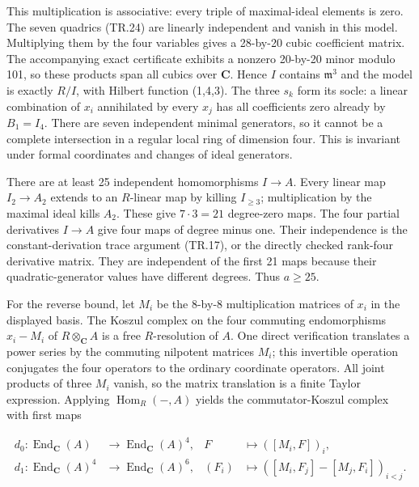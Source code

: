 This multiplication is associative: every triple of maximal-ideal
elements is zero. The seven quadrics (TR.24) are linearly independent
and vanish in this model. Multiplying them by the four variables gives
a 28-by-20 cubic coefficient matrix. The accompanying exact certificate
exhibits a nonzero 20-by-20 minor modulo 101, so these products span all
cubics over \(\mathbf C\). Hence \(I\) contains \(\mathfrak m^3\) and the model is exactly \(R/I\), with
Hilbert function (1,4,3). The three \(s_k\) form its socle: a linear
combination of \(x_i\) annihilated by every \(x_j\) has all coefficients zero
already by \(B_1=I_4\). There are seven independent minimal generators,
so it cannot be a complete intersection in a regular local ring of
dimension four. This is invariant under formal coordinates and changes
of ideal generators.

There are at least 25 independent homomorphisms \(I\to A\). Every linear map
\(I_2\to A_2\) extends to an \(R\)-linear map by killing \(I_{\ge3}\); multiplication
by the maximal ideal kills \(A_2\). These give \(7\cdot3=21\) degree-zero maps.
The four partial derivatives \(I\to A\) give four maps of degree minus one.
Their independence is the constant-derivation trace argument (TR.17),
or the directly checked rank-four derivative matrix. They are independent
of the first 21 maps because their quadratic-generator values have
different degrees. Thus \(a\ge25\).

For the reverse bound, let \(M_i\) be the 8-by-8 multiplication matrices
of \(x_i\) in the displayed basis. The Koszul complex on the four commuting
endomorphisms \(x_i-M_i\) of \(R\otimes_{\mathbf C}A\) is a free \(R\)-resolution of \(A\).
One direct verification translates a power series by the commuting
nilpotent matrices \(M_i\); this invertible operation conjugates the four
operators to the ordinary coordinate operators. All joint products
of three \(M_i\) vanish, so the matrix translation is a finite Taylor
expression. Applying \(\operatorname{Hom}_R(-,A)\) yields the commutator-Koszul complex
with first maps

\[
 \begin{aligned}
 d_0:\operatorname{End}_{\mathbf C}(A)&\longrightarrow
                      \operatorname{End}_{\mathbf C}(A)^4,
             &F&\longmapsto([M_i,F])_i,\\
 d_1:\operatorname{End}_{\mathbf C}(A)^4&\longrightarrow
                      \operatorname{End}_{\mathbf C}(A)^6,
             &(F_i)&\longmapsto([M_i,F_j]-[M_j,F_i])_{i<j}.
 \end{aligned}
 \tag{TR.26}
\]

